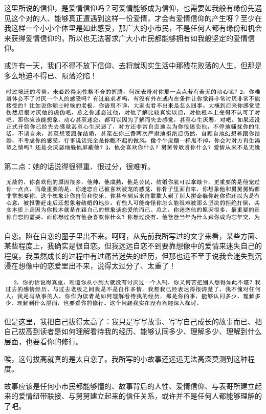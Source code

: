 \documentclass[9pt, b5paper]{article}
\begin{document}
这里所说的信仰，是爱情信仰吗？可爱情能够成为信仰，也需要如我般有缘份先遇见这个对的人、能够真正遭遇到这样一份爱情，才会有爱情信仰的产生呀？至少在我这样一个小小个体里是如此感受，那广大的小市民，不是任何人都有缘份和机会来获得爱情信仰的，所以也无法奢求广大小市民都能够拥有如我般坚定的爱情信仰。

或许有一天，我们不得不放下信仰、去将就现实生活中那残花败落的人生，但那是多么地迫不得已、陨落沦陷！

\begin{center}
\includegraphics[width=.9\linewidth]{./pic/p1p109-2.png}
\end{center}

第二点：她的话说得很得重、很过分，很难听。

\begin{center}
\includegraphics[width=.9\linewidth]{./pic/p1p109-3.png}
\end{center}

自恋。陷在自恋的圈子里出不来。呵呵，从先前我所写过的文字来看，某些方面、某些程度上，我确实是很自恋。但我远远自恋不到要靠想像中的爱情来迷失自己的程度。我虽然成长的过程中有过痛苦迷失的经历，但那也远不至于说我会迷失到沉浸在想像中的恋爱里出不来，说得太过分了、太重了！

\begin{center}
\includegraphics[width=.9\linewidth]{./pic/p1p114-3.png}
\end{center}

但是这里，我把自己拔得太高了：我只是写写故事、写写自己成长的故事而已、把自己拔高到读者是如何理解看待我的经历、能够认同多少、理解多少、理解到什么层面，也要看你的修行。

唉，这句拔高就真的是太自恋了。我所写的小故事还远远无法高深莫测到这种程度。

故事应该是任何小市民都能够懂的、故事背后的人性、爱情信仰、与表哥所建立起来的爱情纽带联接、与舅舅建立起来的信任关系，或许并不是任何人都能够理解的了吧。 
\end{document}
